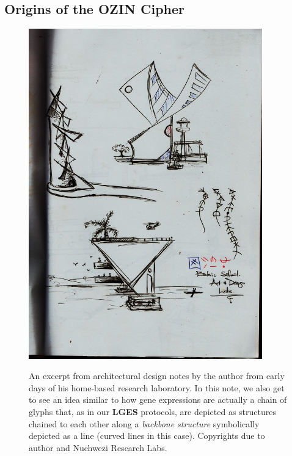 \documentclass[a4paper, 18pt]{book} %
\begin{document}

\begin{appendices}

\chapter{Origins of the OZIN Cipher}
\label{APPOZIN}

\begin{figure}[H]
  \begin{center}
   \includegraphics[trim=0cm 4cm 0cm 2.8cm, clip, width=0.9\textwidth,]{resources/pdfs/ozin_gene_expressions.pdf}\\
   \caption{An excerpt from architectural design notes by the author from early days of his home-based research laboratory. In this note, we also get to see an idea similar to how gene expressions are actually a chain of glyphs that, as in our \textbf{LGES} protocols, are depicted as structures chained to each other along a \textit{backbone structure} symbolically depicted as a line (curved lines in this case). Copyrights due to author and Nuchwezi Research Labs.}
  \label{FIGCODEOZINART}
  \end{center}
\end{figure}



\end{appendices}
\end{document}
